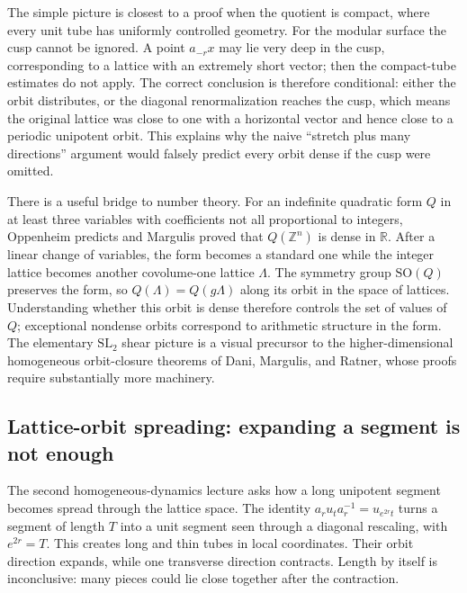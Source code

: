 The simple picture is closest to a proof when the quotient is compact, where every unit tube has uniformly controlled geometry. For the modular surface the cusp cannot be ignored. A point \(a_{-r}x\) may lie very deep in the cusp, corresponding to a lattice with an extremely short vector; then the compact-tube estimates do not apply. The correct conclusion is therefore conditional: either the orbit distributes, or the diagonal renormalization reaches the cusp, which means the original lattice was close to one with a horizontal vector and hence close to a periodic unipotent orbit. This explains why the naive ``stretch plus many directions'' argument would falsely predict every orbit dense if the cusp were omitted.

There is a useful bridge to number theory. For an indefinite quadratic form \(Q\) in at least three variables with coefficients not all proportional to integers, Oppenheim predicts and Margulis proved that \(Q(\mathbb Z^n)\) is dense in \(\mathbb R\). After a linear change of variables, the form becomes a standard one while the integer lattice becomes another covolume-one lattice \(\Lambda\). The symmetry group \(\mathrm{SO}(Q)\) preserves the form, so \(Q(\Lambda)=Q(g\Lambda)\) along its orbit in the space of lattices. Understanding whether this orbit is dense therefore controls the set of values of \(Q\); exceptional nondense orbits correspond to arithmetic structure in the form. The elementary \(\mathrm{SL}_2\) shear picture is a visual precursor to the higher-dimensional homogeneous orbit-closure theorems of Dani, Margulis, and Ratner, whose proofs require substantially more machinery.

\subsection{Lattice-orbit spreading: expanding a segment is not enough}\label{04-visual-computing-ii-ch033-lattice-orbit-spreading-expanding-a-segment-is-not-enough-1}

The second homogeneous-dynamics lecture asks how a long unipotent segment becomes spread through the lattice space. The identity \(a_r u_t a_r^{-1}=u_{e^{2r}t}\) turns a segment of length \(T\) into a unit segment seen through a diagonal rescaling, with \(e^{2r}=T\). This creates long and thin tubes in local coordinates. Their orbit direction expands, while one transverse direction contracts. Length by itself is inconclusive: many pieces could lie close together after the contraction.

